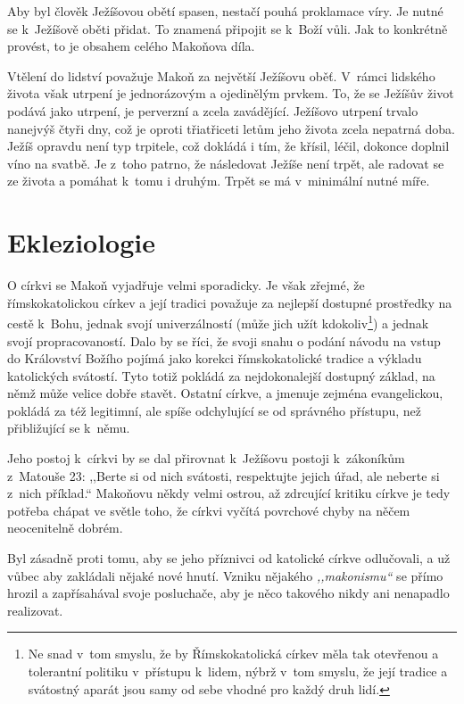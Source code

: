 Aby byl člověk Ježíšovou obětí spasen, nestačí pouhá proklamace víry. Je nutné
se k~Ježíšově oběti přidat. To znamená připojit se k~Boží vůli. Jak to konkrétně
provést, to je obsahem celého Makoňova díla.

Vtělení do lidství považuje Makoň za největší Ježíšovu oběť. V~rámci lidského
života však utrpení je jednorázovým a ojedinělým prvkem. To, že se Ježíšův
život podává jako utrpení, je perverzní a zcela zavádějící. Ježíšovo utrpení
trvalo nanejvýš čtyři dny, což je oproti třiatřiceti letům jeho života zcela
nepatrná doba. Ježíš opravdu není typ trpitele, což dokládá i tím, že křísil,
léčil, dokonce doplnil víno na svatbě. Je z~toho patrno, že následovat Ježíše
není trpět, ale radovat se ze života a pomáhat k~tomu i druhým. Trpět se má
v~minimální nutné míře.

\section{Ekleziologie}

O církvi se Makoň vyjadřuje velmi sporadicky. Je však zřejmé, že římskokatolickou
církev a její tradici považuje za nejlepší dostupné prostředky na cestě k~Bohu,
jednak svojí univerzálností (může jich užít kdokoliv\footnote{Ne snad v~tom
smyslu, že by Římskokatolická církev měla tak otevřenou a tolerantní politiku
v~přístupu k~lidem, nýbrž v~tom smyslu, že její tradice a svátostný aparát
jsou samy od sebe vhodné pro každý druh lidí.}) a jednak svojí
propracovaností. Dalo by se říci, že svoji snahu o podání návodu na vstup do
Království Božího pojímá jako korekci římskokatolické tradice a výkladu
katolických svátostí. Tyto totiž pokládá za nejdokonalejší dostupný základ, na
němž může velice dobře stavět. Ostatní církve, a jmenuje zejména evangelickou,
pokládá za též legitimní, ale spíše odchylující se od správného přístupu, než
přibližující se k~němu.

Jeho postoj k~církvi by se dal přirovnat k~Ježíšovu postoji k~zákoníkům
z~Matouše 23: ,,Berte
si od nich svátosti, respektujte jejich úřad, ale neberte si z~nich příklad.``
Makoňovu někdy velmi ostrou, až zdrcující kritiku církve je tedy potřeba chápat
ve světle toho, že církvi vyčítá povrchové chyby na něčem neocenitelně dobrém.

Byl zásadně proti tomu, aby se jeho příznivci od katolické církve odlučovali, a
už vůbec aby zakládali nějaké nové hnutí. Vzniku nějakého \textit{,,makonismu``}
se přímo hrozil a zapřísahával svoje posluchače, aby je něco takového nikdy ani
nenapadlo realizovat.


